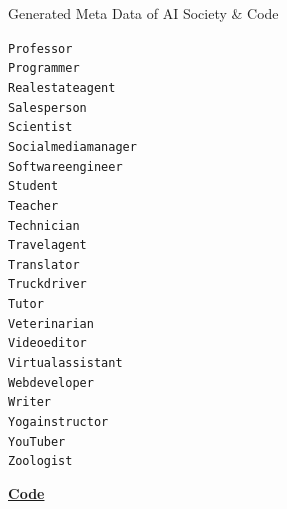 \begin{figure}[h]
\begin{AIBox}{Generated Meta Data of AI Society \& Code}
{{{\begin{alltt}
						Professor \\
						Programmer \\
						Real estate agent \\
						Salesperson \\
						Scientist \\
						Social media manager \\
						Software engineer \\
						Student \\
						Teacher \\
						Technician \\
						Travel agent \\
						Translator \\
						Truck driver \\
						Tutor \\
						Veterinarian \\
						Video editor \\
						Virtual assistant \\
						Web developer \\
						Writer \\
						Yoga instructor \\
						YouTuber \\
						Zoologist
					\end{alltt}}%
			}
			\vline \hspace{10pt}
			\parbox[t][][t]{0.45\textwidth}{{\bf \underline{Code}} \\

}}
\end{AIBox}
\end{figure}
